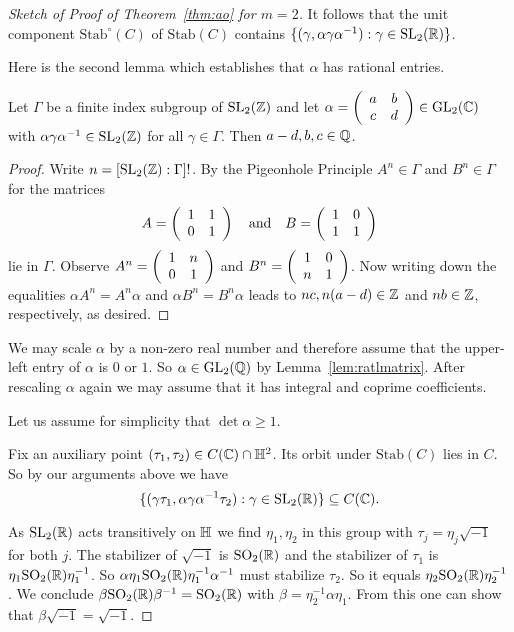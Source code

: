 \begin{proof}[Sketch of Proof of Theorem~\ref{thm:ao} for $m=2$]
  It follows that the unit component $\mathrm{Stab}^\circ(C)$ of
  $\mathrm{Stab}(C)$
  contains
  $\{(\gamma,\alpha\gamma\alpha^{-1}) : \gamma \in\mathrm{SL}_2({\mathbb{R}})
  \}$.

  Here is the second lemma which establishes that $\alpha$ has
  rational entries. 

  \begin{lemma}
    \label{lem:ratlmatrix}
    Let $\Gamma$ be a finite index subgroup of $\mathrm{SL}_2({\mathbb{Z}})$
    and let $\alpha=\left( \begin{array}{cc} {a} & {b} \\ {c} & {d} \end{array} \right)\in \mathrm{GL}_2({\mathbb{C}})$ with
    $\alpha\gamma\alpha^{-1}\in\mathrm{SL}_2({\mathbb{Z}})$ for all
    $\gamma\in\Gamma$. Then $a-d,b,c\in{\mathbb{Q}}$. 
  \end{lemma}
  \begin{proof}
    Write $n=[\mathrm{SL}_2({\mathbb{Z}}):\Gamma]!$. By the
    Pigeonhole Principle $A^n\in\Gamma$ and $B^n\in\Gamma$ for the  matrices
    \begin{equation*}
      A=\left( \begin{array}{cc} {1} & {1} \\ {0} & {1} \end{array} \right)
      \quad\text{and}\quad
      B=\left( \begin{array}{cc} {1} & {0} \\ {1} & {1} \end{array} \right)
    \end{equation*}
    lie in $\Gamma$. Observe
    $A^n = \left( \begin{array}{cc} {1} & {n} \\ {0} & {1} \end{array} \right)$ and $B^n=\left( \begin{array}{cc} {1} & {0} \\ {n} & {1} \end{array} \right)$.
    Now writing down the equalities 
    $\alpha A^n= A^n\alpha$ and $\alpha B^n=B^n\alpha$ leads to
    $nc,n(a-d)\in{\mathbb{Z}}$ and $nb\in{\mathbb{Z}}$, respectively, as desired. 
  \end{proof}

  We may scale $\alpha$ by a non-zero real number and therefore assume
  that the upper-left entry of $\alpha$ is $0$ or $1$. So $\alpha\in
  \mathrm{GL}_2({\mathbb{Q}})$ by Lemma~\ref{lem:ratlmatrix}.
  After rescaling
  $\alpha$ again we may assume that it has integral and coprime
  coefficients.

  Let us assume for simplicity that $\det \alpha \ge 1$. 

  Fix an auxiliary point $(\tau_1,\tau_2)\in C({\mathbb{C}})\cap {\mathbb{H}}^2$. Its
  orbit under $\mathrm{Stab}(C)$ lies in $C$. So by our arguments
  above we have
  \begin{equation}
    \label{eq:stabilizerincurve}
    \{(\gamma\tau_1,\alpha\gamma\alpha^{-1}\tau_2) : \gamma \in \mathrm{SL}_2({\mathbb{R}})\}
    \subseteq C({\mathbb{C}}). 
  \end{equation}

  As $\mathrm{SL}_2({\mathbb{R}})$ acts transitively on ${\mathbb{H}}$ we find
  $\eta_1,\eta_2$ in this group with $\tau_j = \eta_j \sqrt{-1}$ for
  both $j$. The stabilizer of $\sqrt{-1}$ is  $\mathrm{SO}_2({\mathbb{R}})$ and
  the stabilizer of $\tau_1$ is $\eta_1\mathrm{SO}_2({\mathbb{R}})\eta_1^{-1}$. So
  $\alpha \eta_1\mathrm{SO}_2({\mathbb{R}}) \eta_1^{-1} \alpha^{-1}$ must stabilize
  $\tau_2$. So it equals $\eta_2\mathrm{SO}_2({\mathbb{R}})\eta_2^{-1}$.
  We conclude $\beta \mathrm{SO}_2({\mathbb{R}})
  \beta^{-1} = \mathrm{SO}_2({\mathbb{R}})$ with
  $\beta = \eta_2^{-1}\alpha\eta_1$. From this one can
  show that $\beta\sqrt{-1}=\sqrt{-1}$.


\end{proof}
